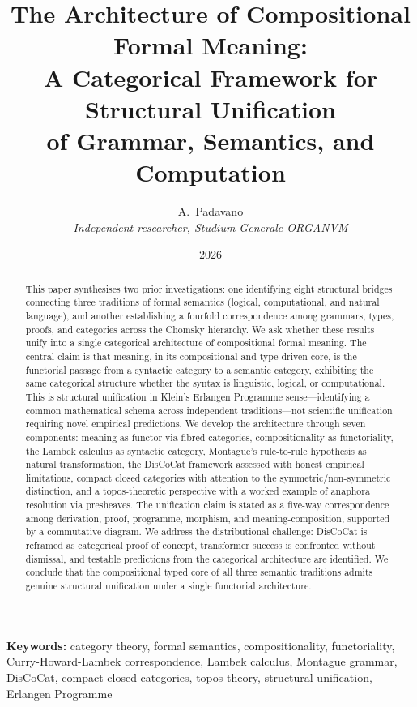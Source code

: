 \documentclass[12pt,a4paper]{article}
\title{The Architecture of Compositional Formal Meaning:\\
A Categorical Framework for Structural Unification\\
of Grammar, Semantics, and Computation}
\author{A.~Padavano\\
  \textit{Independent researcher, Studium Generale ORGANVM}}
\date{2026}
\begin{document}
\maketitle

\begin{abstract}
This paper synthesises two prior investigations: one identifying eight
structural bridges connecting three traditions of formal semantics (logical,
computational, and natural language), and another establishing a fourfold
correspondence among grammars, types, proofs, and categories across the
Chomsky hierarchy. We ask whether these results unify into a single
categorical architecture of compositional formal meaning. The central claim
is that meaning, in its compositional and type-driven core, is the functorial
passage from a syntactic category to a semantic category, exhibiting the same
categorical structure whether the syntax is linguistic, logical, or
computational. This is structural unification in Klein's Erlangen Programme
sense---identifying a common mathematical schema across independent
traditions---not scientific unification requiring novel empirical predictions.
We develop the architecture through seven components: meaning as functor via
fibred categories, compositionality as functoriality, the Lambek calculus as
syntactic category, Montague's rule-to-rule hypothesis as natural
transformation, the DisCoCat framework assessed with honest empirical
limitations, compact closed categories with attention to the
symmetric/non-symmetric distinction, and a topos-theoretic perspective with a
worked example of anaphora resolution via presheaves. The unification claim is
stated as a five-way correspondence among derivation, proof, programme,
morphism, and meaning-composition, supported by a commutative diagram. We
address the distributional challenge: DisCoCat is reframed as categorical
proof of concept, transformer success is confronted without dismissal, and
testable predictions from the categorical architecture are identified. We
conclude that the compositional typed core of all three semantic traditions
admits genuine structural unification under a single functorial architecture.
\end{abstract}

\noindent\textbf{Keywords:} category theory, formal semantics,
compositionality, functoriality, Curry-Howard-Lambek correspondence, Lambek
calculus, Montague grammar, DisCoCat, compact closed categories, topos theory,
structural unification, Erlangen Programme

\bigskip
\end{document}
